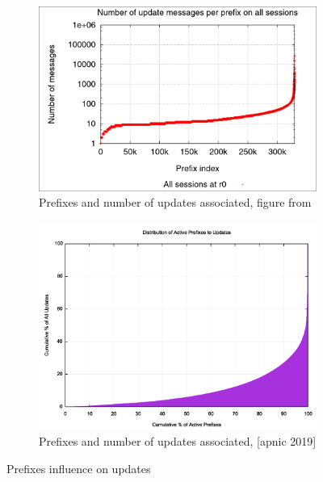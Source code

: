 \begin{figure}[h]
     \centering
     \begin{subfigure}[b]{0.48\textwidth}
         \centering
         \includegraphics[width=\textwidth]{images/RFD/miceVSelephants/prefixVSmessagesRbush.png}
		 \caption{Prefixes and number of updates associated, figure from \cite{pelsser2011route}}
         \label{fig:RBushPrefixes}
     \end{subfigure}
     \hfill
     \begin{subfigure}[b]{0.50\textwidth}
         \centering
         \includegraphics[width=\textwidth]{images/RFD/miceVSelephants/bgp2fig5-pfx-upds-cuml.png}
         \caption{Prefixes and number of updates associated, [apnic 2019]}
         \label{fig:apnicPrefixes}
     \end{subfigure}
        \caption{Prefixes influence on updates}
        \label{fig:prefixVSmessages}
\end{figure}

